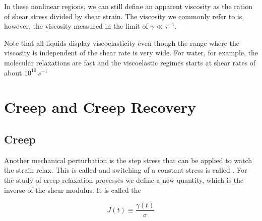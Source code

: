 \documentclass[letterpaper,10pt,english]{sphinxmanual}
\begin{document}
\sphinxAtStartPar
In these nonlinear regions, we can still define an apparent viscosity as the ration of shear stress divided by shear strain. The viscosity we commonly refer to is, however, the viscosity measured in the limit of \(\gamma\ll \tau^{-1}\).

\sphinxAtStartPar
Note that all liquids display viscoelasticity even though the range where the viscosity is independent of the shear rate is very wide. For water, for example, the molecular relaxations are fast and the viscoelastic regimes starts at shear rates of about \(10^{10}\, s^{-1}\)


\section{Creep and Creep Recovery}
\label{\detokenize{notebooks/L24/1_Viscoelasticity:Creep-and-Creep-Recovery}}

\subsection{Creep}
\label{\detokenize{notebooks/L24/1_Viscoelasticity:Creep}}
\sphinxAtStartPar
Another mechanical perturbation is the step stress that can be applied to watch the strain relax. This is called  and switching of a constant stress is called . For the study of creep relaxation processes we define a new quantity, which is the inverse of the shear modulus. It is called the 

\sphinxAtStartPar
\begin{equation}
J(t)\equiv \frac{\gamma(t)}{\sigma} \tag{Creep Compliance}
\end{equation}
\end{document}
